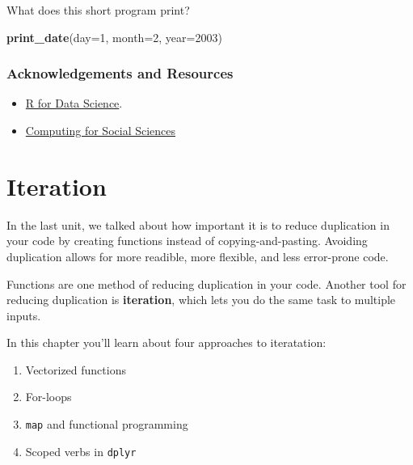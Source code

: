 \documentclass[]{book}
\newenvironment{Shaded}{\begin{snugshade}}{\end{snugshade}}
\newcommand{\KeywordTok}[1]{\textcolor[rgb]{0.13,0.29,0.53}{\textbf{#1}}}
\newcommand{\DataTypeTok}[1]{\textcolor[rgb]{0.13,0.29,0.53}{#1}}
\newcommand{\DecValTok}[1]{\textcolor[rgb]{0.00,0.00,0.81}{#1}}
\newcommand{\NormalTok}[1]{#1}
\providecommand{\tightlist}{%
  \setlength{\itemsep}{0pt}\setlength{\parskip}{0pt}}
\begin{document}
What does this short program print?

\begin{Shaded}
\begin{Highlighting}[]
\KeywordTok{print_date}\NormalTok{(}\DataTypeTok{day=}\DecValTok{1}\NormalTok{, }\DataTypeTok{month=}\DecValTok{2}\NormalTok{, }\DataTypeTok{year=}\DecValTok{2003}\NormalTok{)}
\end{Highlighting}
\end{Shaded}

\subsubsection*{Acknowledgements and
Resources}\label{acknowledgements-and-resources}

\begin{itemize}
\tightlist
\item
  \href{https://r4ds.had.co.nz/functions.html}{R for Data Science}.
\item
  \href{https://cfss.uchicago.edu/notes/functions}{Computing for Social
  Sciences}
\end{itemize}

\hypertarget{iteration}{\section{Iteration}\label{iteration}}

In the last unit, we talked about how important it is to reduce
duplication in your code by creating functions instead of
copying-and-pasting. Avoiding duplication allows for more readible, more
flexible, and less error-prone code.

Functions are one method of reducing duplication in your code. Another
tool for reducing duplication is \textbf{iteration}, which lets you do
the same task to multiple inputs.

In this chapter you'll learn about four approaches to iteratation:

\begin{enumerate}
\def\labelenumi{\arabic{enumi}.}
\tightlist
\item
  Vectorized functions
\item
  For-loops
\item
  \texttt{map} and functional programming
\item
  Scoped verbs in \texttt{dplyr}
\end{enumerate}
\end{document}
